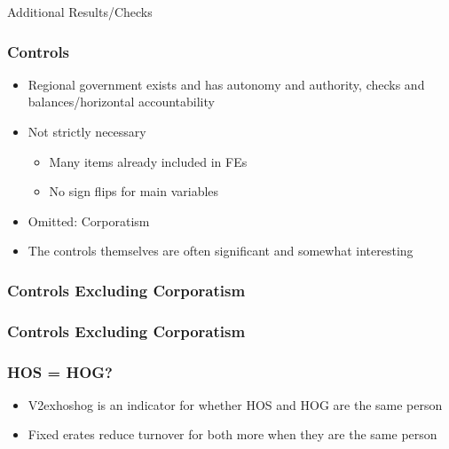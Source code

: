 \documentclass{beamer}
\begin{document}
    \begin{frame}
        \centering Additional Results/Checks
    \end{frame}

    \begin{frame}
        \frametitle{Controls}
        \begin{itemize}
            \item Regional government exists and has autonomy and authority, checks and balances/horizontal accountability
            \item Not strictly necessary
                \begin{itemize}
                    \item Many items already included in FEs
                    \item No sign flips for main variables
                \end{itemize}
            \item Omitted: Corporatism
            \item The controls themselves are often significant and somewhat interesting
        \end{itemize}
    \end{frame}

    \begin{frame}
        \frametitle{Controls Excluding Corporatism}
        {
            \let\oldcentering\centering
            \renewcommand\centering{\tiny\oldcentering}
            
        }
    \end{frame}

    \begin{frame}
        \frametitle{Controls Excluding Corporatism}
        {
            \let\oldcentering\centering
            \renewcommand\centering{\tiny\oldcentering}
            
        }
    \end{frame}

    \begin{frame}
        \frametitle{HOS = HOG?}
        \begin{itemize}
            \item V2exhoshog is an indicator for whether HOS and HOG are the same person
            \item Fixed erates reduce turnover for both more when they are the same person
        \end{itemize}
    \end{frame}
\end{document}
